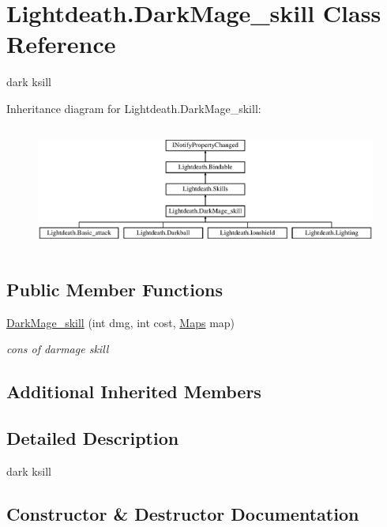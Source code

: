 \hypertarget{class_lightdeath_1_1_dark_mage__skill}{}\section{Lightdeath.\+Dark\+Mage\+\_\+skill Class Reference}
\label{class_lightdeath_1_1_dark_mage__skill}


dark ksill  


Inheritance diagram for Lightdeath.\+Dark\+Mage\+\_\+skill\+:\begin{figure}[H]
\begin{center}
\leavevmode
\includegraphics[height=4.142012cm]{class_lightdeath_1_1_dark_mage__skill}
\end{center}
\end{figure}
\subsection*{Public Member Functions}
\begin{DoxyCompactItemize}
\item 
\hyperlink{class_lightdeath_1_1_dark_mage__skill_a84b756e048a767b02e3e127c677a0dd5}{Dark\+Mage\+\_\+skill} (int dmg, int cost, \hyperlink{class_lightdeath_1_1_maps}{Maps} map)
\begin{DoxyCompactList}\small\item\em cons of darmage skill \end{DoxyCompactList}\end{DoxyCompactItemize}
\subsection*{Additional Inherited Members}


\subsection{Detailed Description}
dark ksill 



\subsection{Constructor \& Destructor Documentation}
\hypertarget{class_lightdeath_1_1_dark_mage__skill_a84b756e048a767b02e3e127c677a0dd5}{}\label{class_lightdeath_1_1_dark_mage__skill_a84b756e048a767b02e3e127c677a0dd5} 
